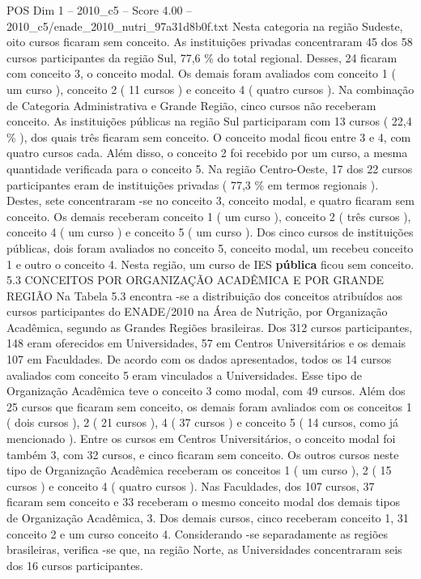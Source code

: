 \begin{textsample}{POS Dim 1 – 2010\_c5 – Score 4.00 – 2010\_c5/enade\_2010\_nutri\_97a31d8b0f.txt}
Nesta categoria na região Sudeste, oito cursos ficaram sem conceito.
As instituições privadas concentraram 45 dos 58 cursos participantes da região Sul, 77,6 \% do total regional.
Desses, 24 ficaram com conceito 3, o conceito modal.
Os demais foram avaliados com conceito 1 ( um curso ), conceito 2 ( 11 cursos ) e conceito 4 ( quatro cursos ).
Na combinação de Categoria Administrativa e Grande Região, cinco cursos não receberam conceito.
As instituições públicas na região Sul participaram com 13 cursos ( 22,4 \% ), dos quais três ficaram sem conceito.
O conceito modal ficou entre 3 e 4, com quatro cursos cada.
Além disso, o conceito 2 foi recebido por um curso, a mesma quantidade verificada para o conceito 5.
Na região Centro-Oeste, 17 dos 22 cursos participantes eram de instituições privadas ( 77,3 \% em termos regionais ).
Destes, sete concentraram -se no conceito 3, conceito modal, e quatro ficaram sem conceito.
Os demais receberam conceito 1 ( um curso ), conceito 2 ( três cursos ), conceito 4 ( um curso ) e conceito 5 ( um curso ).
Dos cinco cursos de instituições públicas, dois foram avaliados no conceito 5, conceito modal, um recebeu conceito 1 e outro o conceito 4.
Nesta região, um curso de IES \textbf{pública} ficou sem conceito. 5.3 CONCEITOS POR ORGANIZAÇÃO ACADÊMICA E POR GRANDE REGIÃO Na Tabela 5.3 encontra -se a distribuição dos conceitos atribuídos aos cursos participantes do ENADE/2010 na Área de Nutrição, por Organização Acadêmica, segundo as Grandes Regiões brasileiras.
Dos 312 cursos participantes, 148 eram oferecidos em Universidades, 57 em Centros Universitários e os demais 107 em Faculdades.
De acordo com os dados apresentados, todos os 14 cursos avaliados com conceito 5 eram vinculados a Universidades.
Esse tipo de Organização Acadêmica teve o conceito 3 como modal, com 49 cursos.
Além dos 25 cursos que ficaram sem conceito, os demais foram avaliados com os conceitos 1 ( dois cursos ), 2 ( 21 cursos ), 4 ( 37 cursos ) e conceito 5 ( 14 cursos, como já mencionado ).
Entre os cursos em Centros Universitários, o conceito modal foi também 3, com 32 cursos, e cinco ficaram sem conceito.
Os outros cursos neste tipo de Organização Acadêmica receberam os conceitos 1 ( um curso ), 2 ( 15 cursos ) e conceito 4 ( quatro cursos ).
Nas Faculdades, dos 107 cursos, 37 ficaram sem conceito e 33 receberam o mesmo conceito modal dos demais tipos de Organização Acadêmica, 3.
Dos demais cursos, cinco receberam conceito 1, 31 conceito 2 e um curso conceito 4.
Considerando -se separadamente as regiões brasileiras, verifica -se que, na região Norte, as Universidades concentraram seis dos 16 cursos participantes.

\end{textsample}
